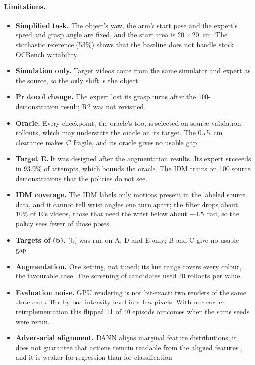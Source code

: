 \documentclass{article}
\begin{document}
\paragraph{Limitations.}
\begin{itemize}
  \item \textbf{Simplified task.} The object's yaw, the arm's start pose and the expert's
  speed and grasp angle are fixed, and the start area is $20 \times 20$~cm. The
  stochastic reference (53\%) shows that the baseline does not handle stock OCBench
  variability.
  \item \textbf{Simulation only.} Target videos come from the same simulator and expert
  as the source, so the only shift is the object.
  \item \textbf{Protocol change.} The expert lost its grasp turns after the 100-demonstration
  result; R2 was not revisited.
  \item \textbf{Oracle.} Every checkpoint, the oracle's too, is selected on source
  validation rollouts, which may understate the oracle on its target. The 0.75~cm
  clearance makes C fragile, and its oracle gives no usable gap.
  \item \textbf{Target E.} It was designed after the augmentation results. Its expert
  succeeds in 93.9\% of attempts, which bounds the oracle. The IDM trains on 100 source
  demonstrations that the policies do not see.
  \item \textbf{IDM coverage.} The IDM labels only motions present in the labeled source
  data, and it cannot tell wrist angles one turn apart; the filter drops about 10\% of
  E's videos, those that need the wrist below about $-4.5$~rad, so the policy sees fewer
  of those poses.
  \item \textbf{Targets of (b).} (b) was run on A, D and E only; B and C give no usable
  gap.
  \item \textbf{Augmentation.} One setting, not tuned; its hue range covers every colour,
  the favourable case. The screening of candidates used 20 rollouts per value.
  \item \textbf{Evaluation noise.} GPU rendering is not bit-exact: two renders of the
  same state can differ by one intensity level in a few pixels. With our earlier
  reimplementation this flipped 11 of 40 episode outcomes when the same seeds were
  rerun.
  \item \textbf{Adversarial alignment.} DANN aligns marginal feature distributions; it
  does not guarantee that actions remain readable from the aligned features
  \citep{zhao2019invariant}, and it is weaker for regression than for classification

\end{itemize}
\end{document}
